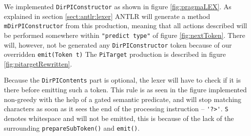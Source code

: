 We implemented \verb!DirPIConstructor! as shown in figure \ref{fig:pragmaLEX}. As explained in section \ref{sect:antlr:lexer} ANTLR will generate a method \verb!mDirPIConstructor! from this production, meaning that all actions described will be performed somewhere within \verb!"predict type"! of figure \ref{fig:nextToken}. There will, however, not be generated any \verb!DirPIConstructor! token because of our overridden \verb!emit(Token t)! The \verb!PiTarget! production is described in figure \ref{fig:pitargetRewritten}.

Because the \verb!DirPIContents! part is optional, the lexer will have to check if it is there before emitting such a token. This rule is as seen in the figure implemented non-greedy with the help of a gated semantic predicate, and will stop matching characters as soon as it sees the end of the processing instruction -- \verb!'?>'!. \verb!S! denotes whitespace and will not be emitted, this is because of the lack of the surrounding \verb!prepareSubToken()! and \verb!emit()!.

